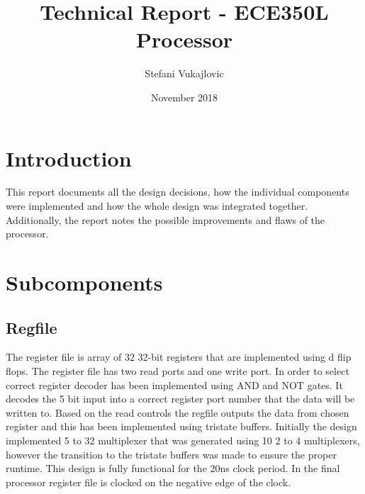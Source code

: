 \documentclass{article}
\title{Technical Report - ECE350L Processor}
\author{Stefani Vukajlovic}
\date{November 2018}
\begin{document}
\maketitle
\newpage
\tableofcontents
\newpage
\section{Introduction}
This report documents all the design decisions, how the individual components were implemented and how the whole design was integrated together. Additionally, the report notes the possible improvements and flaws of the processor.
\section{Subcomponents}

\subsection{Regfile}
The register file is array of 32 32-bit registers that are implemented using d flip flops. The register file has two read ports and one write port. In order to select correct register decoder has been implemented using AND and NOT gates. It decodes the 5 bit input into a correct register port number that the data will be written to. Based on the read controls the regfile outputs the data from chosen register and this has been implemented using tristate buffers. Initially the design implemented 5 to 32 multiplexer that was generated using 10 2 to 4 multiplexers, however the transition to the tristate buffers was made to ensure the proper runtime. This design is fully functional for the 20ns clock period. In the final processor register file is clocked on the negative edge of the clock.
\end{document}
